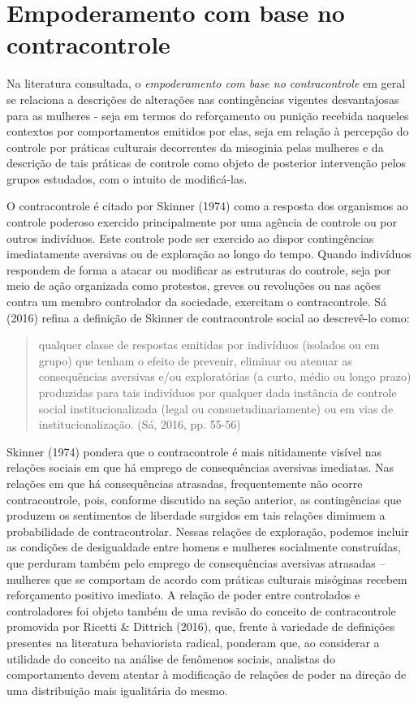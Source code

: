 \section{Empoderamento com base no contracontrole}

Na literatura consultada, o \textit{empoderamento com base no contracontrole} em geral se relaciona a descrições de alterações nas contingências vigentes desvantajosas para as mulheres - seja em termos do reforçamento ou punição recebida naqueles contextos por comportamentos emitidos por elas, seja em relação à percepção do controle por práticas culturais decorrentes da misoginia pelas mulheres e da descrição de tais práticas de controle como objeto de posterior intervenção pelos grupos estudados, com o intuito de modificá-las.

O contracontrole é citado por Skinner (1974) como a resposta dos organismos ao controle poderoso exercido principalmente por uma agência de controle ou por outros indivíduos. Este controle pode ser exercido ao dispor contingências imediatamente aversivas ou de exploração ao longo do tempo. Quando indivíduos respondem de forma a atacar ou modificar as estruturas do controle, seja por meio de ação organizada como protestos, greves ou revoluções ou nas ações contra um membro controlador da sociedade, exercitam o contracontrole. Sá (2016) refina a definição de Skinner de contracontrole social ao descrevê-lo como:

\begin{quote}
    qualquer classe de respostas emitidas por indivíduos (isolados ou em grupo) que tenham o efeito de prevenir, eliminar ou atenuar as consequências aversivas e/ou exploratórias (a curto, médio ou longo prazo) produzidas para tais indivíduos por qualquer dada instância de controle social institucionalizada (legal ou consuetudinariamente) ou em vias de institucionalização. (Sá, 2016, pp. 55-56)
\end{quote}

Skinner (1974) pondera que o contracontrole é mais nitidamente visível nas relações sociais em que há emprego de consequências aversivas imediatas. Nas relações em que há consequências atrasadas, frequentemente não ocorre contracontrole, pois, conforme discutido na seção anterior, as contingências que produzem os sentimentos de liberdade surgidos em tais relações diminuem a probabilidade de contracontrolar. Nessas relações de exploração, podemos incluir as condições de desigualdade entre homens e mulheres socialmente construídas, que perduram também pelo emprego de consequências aversivas atrasadas – mulheres que se comportam de acordo com práticas culturais misóginas recebem reforçamento positivo imediato. A relação de poder entre controlados e controladores foi objeto também de uma revisão do conceito de contracontrole promovida por Ricetti \& Dittrich (2016), que, frente à variedade de definições presentes na literatura behaviorista radical, ponderam que, ao considerar a utilidade do conceito na análise de fenômenos sociais, analistas do comportamento devem atentar à modificação de relações de poder na direção de uma distribuição mais igualitária do mesmo.

